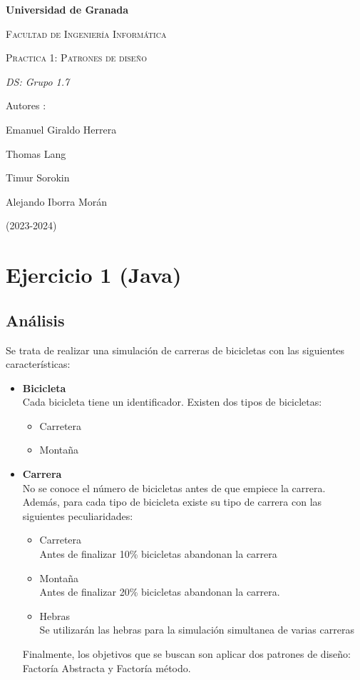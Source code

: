 \documentclass{article}
\begin{document}
	\begin{titlepage}
		\centering
		{\bfseries\LARGE Universidad de Granada\par}
		\vspace{1cm}
		{\scshape\Large Facultad de Ingeniería Informática \par}
		\vspace{3cm}
		{\scshape\Huge Practica 1: Patrones de diseño \par}
		\vspace{3cm}
		{\itshape\Large DS: Grupo 1.7\par}
		\vfill
		{\Large Autores : \par}
			{\Large  Emanuel Giraldo Herrera\par}
			{\Large  Thomas Lang \par}
			{\Large  Timur Sorokin \par}
			{\Large  Alejando Iborra Morán \par}
		\vfill
		{\Large (2023-2024) \par}
	\end{titlepage}
	
	\section{Ejercicio 1 (Java)}
	\subsection{Análisis}
	Se trata de realizar una simulación de carreras de bicicletas con las siguientes características:
	\begin{itemize}
		\item \textbf{Bicicleta}\\
		Cada bicicleta tiene un identificador. Existen dos tipos de bicicletas:
		\begin{itemize}
			\item Carretera
			\item Montaña
		\end{itemize}
		

			\item \textbf{Carrera}\\
			No se conoce el número de bicicletas antes de que empiece la carrera. Además, para cada tipo de bicicleta existe su tipo de carrera con las siguientes peculiaridades:
			\begin{itemize}
				\item Carretera\\
				Antes de finalizar 10\% bicicletas abandonan la carrera
				\item Montaña\\
				Antes de finalizar 20\% bicicletas abandonan la carrera.
				\item Hebras\\
				Se utilizarán las hebras para la simulación simultanea de varias carreras
		\end{itemize}

Finalmente, los objetivos que se buscan son aplicar dos patrones de diseño: Factoría Abstracta y Factoría método.

	\end{itemize}
\end{document}
